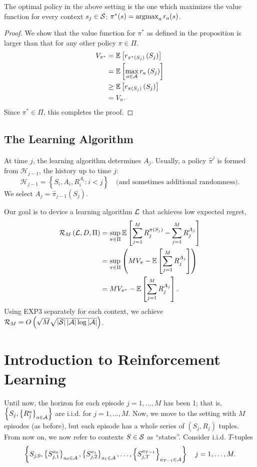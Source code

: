 \documentclass[11pt]{article}
\begin{document}
\begin{proposition}
	The optimal policy in the above setting is the one which maximizes the value function for every context $s_{j} \in \mathcal{S}$: $\pi^{*}(s) = \operatorname*{argmax}_{a} r_{a}(s)$. 
\end{proposition}
\begin{proof}
	We show that the value function for $\pi^{*}$ as defined in the proposition is larger than that for any other policy $\pi \in \Pi$. 
	\begin{align*}
		V_{\pi^*} &= \mathbb{E}\left[r_{\pi^{*}\left(S_{j}\right)}\left(S_{j}\right)\right] \\
		&= \mathbb{E}\left[\max_{a\in\mathcal{A}} r_{a}\left(S_{j}\right)\right] \\
		&\geq \mathbb{E}\left[r_{\pi\left(S_{j}\right)}\left(S_{j}\right)\right] \\
		&= V_{\pi}.
	\end{align*}
	Since $\pi^{*}\in\Pi$, this completes the proof.
\end{proof}

\subsection{The Learning Algorithm}
At time $j$, the learning algorithm determines $A_{j}$. Usually, a policy $\hat{\pi}^{j}$ is formed from $\mathcal{H}_{j-1}$, the history up to time $j$:
\[
	\mathcal{H}_{j-1} = \left\{S_{i}, A_{i}, R_{i}^{A_{i}} : i<j \right\} \quad \text{(and sometimes additional randomness)}.
\]
We select $A_{j} = \hat{\pi}_{j-1}\left(S_{j}\right)$. 

Our goal is to device a learning algorithm $\mathcal{L}$ that achieves low expected regret,
\begin{align*}
	\mathcal{R}_{M}\left(\mathcal{L}, D, \Pi\right) &= \sup_{\pi \in \Pi} \mathbb{E}\left[\sum_{j=1}^{M} R_{j}^{\pi\left(S_{j}\right)} - \sum_{j=1}^{M} R_{j}^{A_{j}}\right] \\
	&= \sup_{\pi\in\Pi} \left(MV_{\pi} - \mathbb{E}\left[\sum_{j=1}^{M} R_{j}^{A_{j}}\right]\right) \\
	&= MV_{\pi^{*}} - \mathbb{E}\left[\sum_{j=1}^{M} R_{j}^{A_{j}}\right].
\end{align*}
Using EXP3 separately for each context, we achieve $\mathcal{R}_{M} = O\left(\sqrt{M} \sqrt{\left|\mathcal{S}\right| \left|\mathcal{A}\right| \log\left|\mathcal{A}\right|}\right)$.

\section{Introduction to Reinforcement Learning}
Until now, the horizon for each episode $j=1,\ldots,M$ has been 1; that is, $\left\{S_{j}, \left\{R_{j}^{a}\right\}_{a\in\mathcal{A}}\right\}$ are i.i.d. for $j=1,\ldots,M$. Now, we move to the setting with $M$ episodes (as before), but each episode has a whole series of $(S_{j}, R_{j})$ tuples. From now on, we now refer to contexts $S\in\mathcal{S}$ as ``states''. Consider i.i.d. $T$-tuples
\[
	\left\{S_{j,0}, \left\{S_{j,1}^{a_{0}}\right\}_{a_{0} \in \mathcal{A}}, \left\{S_{j,2}^{a_{1}}\right\}_{a_{1} \in \mathcal{A}}, \ldots, \left\{S_{j,T}^{a_{T-1}}\right\}_{a_{T-1} \in \mathcal{A}}\right\} \quad j=1,\ldots,M.
\]
\end{document}
